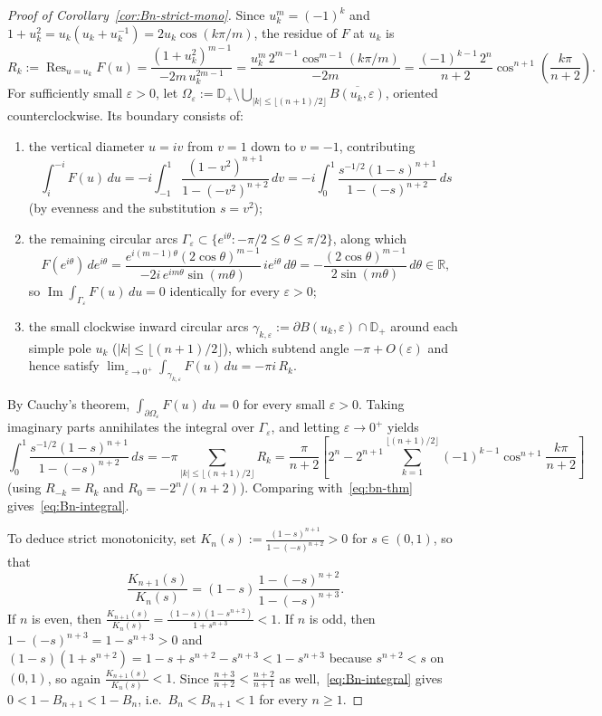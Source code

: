 \documentclass[11pt,a4paper]{article}
\newcommand{\R}{\mathbb{R}}
\newcommand{\D}{\mathbb{D}}
\newcommand{\ImPart}{\operatorname{Im}}
\theoremstyle{remark}
\numberwithin{equation}{section}
\begin{document}
\begin{proof}[Proof of Corollary~\ref{cor:Bn-strict-mono}]
Since $u_k^m = (-1)^k$ and $1 + u_k^2 = u_k(u_k + u_k^{-1}) = 2u_k\cos(k\pi/m)$, the residue of $F$ at $u_k$ is
\[
    R_k := \operatorname{Res}_{u = u_k} F(u)
    = \frac{(1 + u_k^2)^{m-1}}{-2m\,u_k^{2m-1}}
    = \frac{u_k^m\,2^{m-1}\cos^{m-1}(k\pi/m)}{-2m}
    = \frac{(-1)^{k-1}\,2^n}{n+2}\cos^{n+1}\!\left(\frac{k\pi}{n+2}\right).
\]
For sufficiently small $\varepsilon > 0$, let $\Omega_\varepsilon := \D_+ \setminus \bigcup_{|k| \le \lfloor(n+1)/2\rfloor} \overline{B(u_k, \varepsilon)}$, oriented counterclockwise. Its boundary consists of:
\begin{enumerate}[label=\textup{(\arabic*)}]
    \item the vertical diameter $u = iv$ from $v = 1$ down to $v = -1$, contributing
    \[
        \int_i^{-i} F(u)\,du
        = -i\int_{-1}^{1} \frac{(1 - v^2)^{n+1}}{1 - (-v^2)^{n+2}}\,dv
        = -i\int_0^1 \frac{s^{-1/2}(1 - s)^{n+1}}{1 - (-s)^{n+2}}\,ds
    \]
    (by evenness and the substitution $s = v^2$);
    \item the remaining circular arcs $\Gamma_\varepsilon \subset \{e^{i\theta} : -\pi/2 \le \theta \le \pi/2\}$, along which
    \[
        F(e^{i\theta})\,de^{i\theta}
        = \frac{e^{i(m-1)\theta}(2\cos\theta)^{m-1}}{-2i\,e^{im\theta}\sin(m\theta)}\,i e^{i\theta}\,d\theta
        = -\frac{(2\cos\theta)^{m-1}}{2\sin(m\theta)}\,d\theta \in \R,
    \]
    so $\ImPart\int_{\Gamma_\varepsilon} F(u)\,du = 0$ identically for every $\varepsilon > 0$;
    \item the small clockwise inward circular arcs $\gamma_{k,\varepsilon} := \partial B(u_k, \varepsilon) \cap \D_+$ around each simple pole $u_k$ ($|k| \le \lfloor(n+1)/2\rfloor$), which subtend angle $-\pi + O(\varepsilon)$ and hence satisfy $\lim_{\varepsilon \to 0^+}\int_{\gamma_{k,\varepsilon}} F(u)\,du = -\pi i\,R_k$.
\end{enumerate}
By Cauchy's theorem, $\int_{\partial\Omega_\varepsilon} F(u)\,du = 0$ for every small $\varepsilon > 0$. Taking imaginary parts annihilates the integral over $\Gamma_\varepsilon$, and letting $\varepsilon \to 0^+$ yields
\[
    \int_0^1 \frac{s^{-1/2}(1 - s)^{n+1}}{1 - (-s)^{n+2}}\,ds
    = -\pi\sum_{|k| \le \lfloor(n+1)/2\rfloor} R_k
    = \frac{\pi}{n+2}\left[2^n - 2^{n+1}\sum_{k=1}^{\lfloor(n+1)/2\rfloor}(-1)^{k-1}\cos^{n+1}\frac{k\pi}{n+2}\right]
\]
(using $R_{-k} = R_k$ and $R_0 = -2^n/(n+2)$). Comparing with~\eqref{eq:bn-thm} gives~\eqref{eq:Bn-integral}.

To deduce strict monotonicity, set $K_n(s) := \frac{(1 - s)^{n+1}}{1 - (-s)^{n+2}} > 0$ for $s \in (0,1)$, so that
\[
    \frac{K_{n+1}(s)}{K_n(s)} = (1 - s)\,\frac{1 - (-s)^{n+2}}{1 - (-s)^{n+3}}.
\]
If $n$ is even, then $\frac{K_{n+1}(s)}{K_n(s)} = \frac{(1 - s)(1 - s^{n+2})}{1 + s^{n+3}} < 1$. If $n$ is odd, then $1 - (-s)^{n+3} = 1 - s^{n+3} > 0$ and $(1 - s)(1 + s^{n+2}) = 1 - s + s^{n+2} - s^{n+3} < 1 - s^{n+3}$ because $s^{n+2} < s$ on $(0,1)$, so again $\frac{K_{n+1}(s)}{K_n(s)} < 1$. Since $\frac{n+3}{n+2} < \frac{n+2}{n+1}$ as well,~\eqref{eq:Bn-integral} gives $0 < 1 - B_{n+1} < 1 - B_n$, i.e.\ $B_n < B_{n+1} < 1$ for every $n \ge 1$.
\end{proof}
\end{document}
